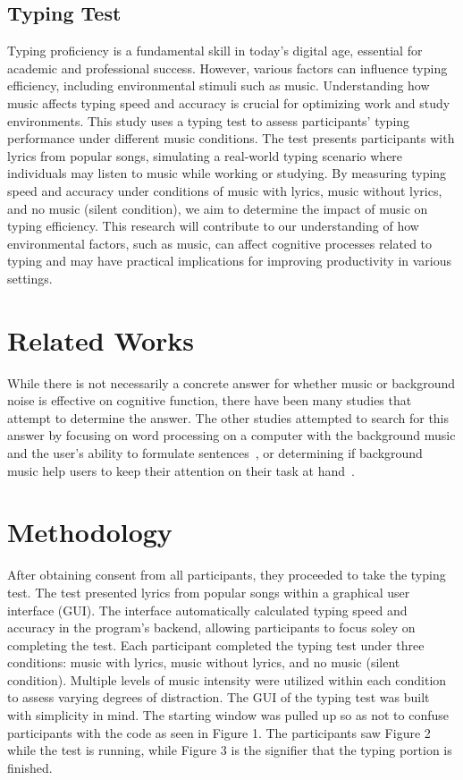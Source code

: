 \documentclass[manuscript, screen, review]{acmart} %
\begin{document}
\subsection{Typing Test}
  Typing proficiency is a fundamental skill in today's digital age, essential for academic and professional success. However, various factors can influence typing efficiency, including environmental stimuli such as music. Understanding how music affects typing speed and accuracy is crucial for optimizing work and study environments.
  This study uses a typing test to assess participants' typing performance under different music conditions. The test presents participants with lyrics from popular songs, simulating a real-world typing scenario where individuals may listen to music while working or studying.
  By measuring typing speed and accuracy under conditions of music with lyrics, music without lyrics, and no music (silent condition), we aim to determine the impact of music on typing efficiency. This research will contribute to our understanding of how environmental factors, such as music, can affect cognitive processes related to typing and may have practical implications for improving productivity in various settings.

\section{Related Works}
While there is not necessarily a concrete answer for whether music or background noise is effective on cognitive function, there have been many
studies that attempt to determine the answer. The other studies attempted to search for this answer by
focusing on word processing on a computer with the background music and the user's ability to formulate sentences~\cite{ransdell2001141}, 
or determining if background music help users to keep their attention on their task at hand~\cite{kiss2021effect}.

\section{Methodology}
  After obtaining consent from all participants, they proceeded to take the typing test. The test presented lyrics from popular songs within a graphical user interface (GUI). 
  The interface automatically calculated typing speed and accuracy in the program's backend, allowing participants to focus soley on completing the test.
  Each participant completed the typing test under three conditions: music with lyrics, music without lyrics, and no music (silent condition).
  Multiple levels of music intensity were utilized within each condition to assess varying degrees of distraction.
  The GUI of the typing test was built with simplicity in mind. The starting window was pulled up so as not to confuse participants with the code as seen in Figure 1. The participants saw Figure 2 while the test is running, while Figure 3 is the signifier that the typing portion is finished. 
\end{document}
